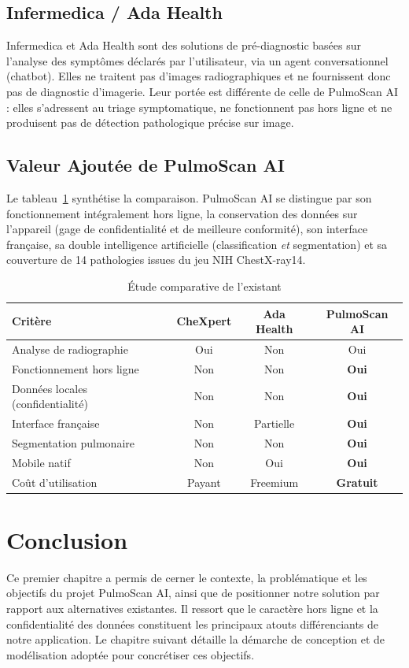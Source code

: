 \documentclass[12pt,a4paper]{report}
\begin{document}
\subsection{Infermedica / Ada Health}
Infermedica et Ada Health sont des solutions de pré-diagnostic basées sur l'analyse des symptômes déclarés par l'utilisateur, via un agent conversationnel (chatbot). Elles ne traitent pas d'images radiographiques et ne fournissent donc pas de diagnostic d'imagerie. Leur portée est différente de celle de PulmoScan AI : elles s'adressent au triage symptomatique, ne fonctionnent pas hors ligne et ne produisent pas de détection pathologique précise sur image.

\subsection{Valeur Ajoutée de PulmoScan AI}
Le tableau~\ref{tab:existant} synthétise la comparaison. PulmoScan AI se distingue par son fonctionnement intégralement hors ligne, la conservation des données sur l'appareil (gage de confidentialité et de meilleure conformité), son interface française, sa double intelligence artificielle (classification \emph{et} segmentation) et sa couverture de 14 pathologies issues du jeu NIH ChestX-ray14.

\begin{table}[H]
\centering
\caption{Étude comparative de l'existant}
\label{tab:existant}
\begin{tabularx}{\textwidth}{X c c c}
\toprule
\textbf{Critère} & \textbf{CheXpert} & \textbf{Ada Health} & \textbf{PulmoScan AI} \\
\midrule
Analyse de radiographie & Oui & Non & Oui \\
Fonctionnement hors ligne & Non & Non & \textbf{Oui} \\
Données locales (confidentialité) & Non & Non & \textbf{Oui} \\
Interface française & Non & Partielle & \textbf{Oui} \\
Segmentation pulmonaire & Non & Non & \textbf{Oui} \\
Mobile natif & Non & Oui & \textbf{Oui} \\
Coût d'utilisation & Payant & Freemium & \textbf{Gratuit} \\
\bottomrule
\end{tabularx}
\end{table}

\section*{Conclusion}
Ce premier chapitre a permis de cerner le contexte, la problématique et les objectifs du projet PulmoScan AI, ainsi que de positionner notre solution par rapport aux alternatives existantes. Il ressort que le caractère hors ligne et la confidentialité des données constituent les principaux atouts différenciants de notre application. Le chapitre suivant détaille la démarche de conception et de modélisation adoptée pour concrétiser ces objectifs.
\end{document}
